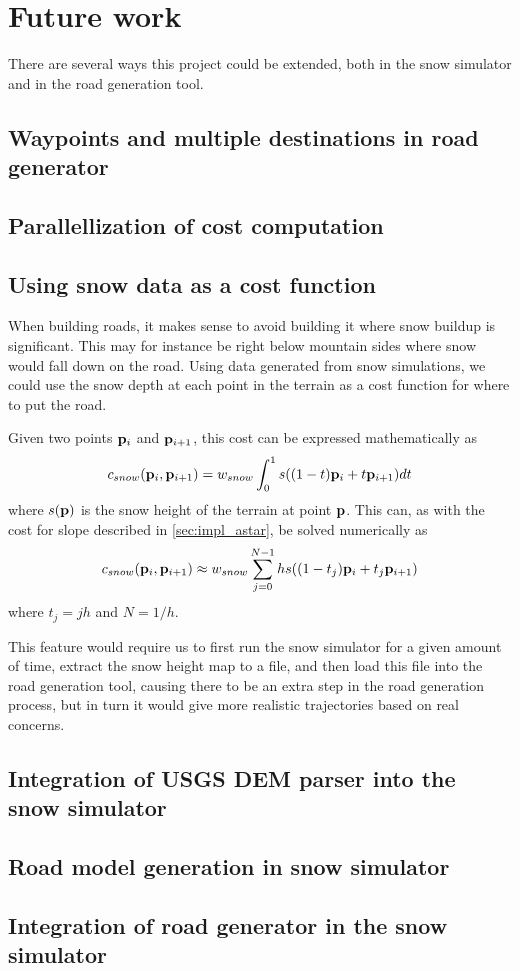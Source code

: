 \chapter{Future work}
\label{chap:futurework}
There are several ways this project could be extended, both in the snow simulator and in the road generation tool. 

\section{Waypoints and multiple destinations in road generator}

\section{Parallellization of cost computation}

\section{Using snow data as a cost function}
When building roads, it makes sense to avoid building it where snow buildup is significant. This may for instance be right below mountain sides where snow would fall down on the road. Using data generated from snow simulations, we could use the snow depth at each point in the terrain as a cost function for where to put the road. 

Given two points ${\mathbf p}_i$ and ${\mathbf p}_{i+1}$, this cost can be expressed mathematically as
$$
c_{snow}({\mathbf p}_i, {\mathbf p}_{i+1}) = w_{snow}\int_{0}^{1} s((1-t){\mathbf p}_i+t{\mathbf p}_{i+1}) dt
$$
where $s({\mathbf p})$ is the snow height of the terrain at point ${\mathbf p}$. This can, as with the cost for slope described in \ref{sec:impl_astar}, be solved numerically as
$$
c_{snow}({\mathbf p}_i, {\mathbf p}_{i+1}) \approx w_{snow}\sum_{j=0}^{N-1} hs((1-t_j){\mathbf p}_i+t_j{\mathbf p}_{i+1}) 
$$
where $t_j=jh$ and $N=1/h$.

This feature would require us to first run the snow simulator for a given amount of time, extract the snow height map to a file, and then load this file into the road generation tool, causing there to be an extra step in the road generation process, but in turn it would give more realistic trajectories based on real concerns.


\section{Integration of USGS DEM parser into the snow simulator}


\section{Road model generation in snow simulator}

\section{Integration of road generator in the snow simulator}
